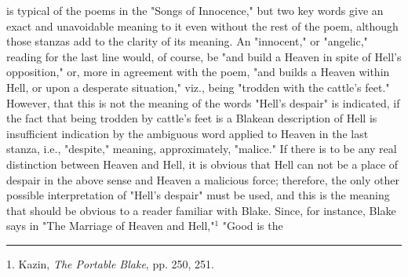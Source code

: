 is typical of the poems in the "Songs of Innocence," but two key words give an exact
and unavoidable meaning to it even without the rest of the poem, although those stanzas add to the clarity
of its meaning. An "innocent," or "angelic," reading for the last line would, of course, be "and build a Heaven in spite
of Hell's opposition," or, more in agreement with the poem, "and builds a Heaven within Hell, or upon a desperate situation,"
viz., being "trodden with the cattle's feet." However, that this is not the meaning of the words "Hell's despair" is
indicated, if the fact that being trodden by cattle's feet is a Blakean description of Hell is insufficient
indication by the ambiguous word applied to Heaven in the last stanza, i.e., "despite," meaning, approximately,
"malice." If there is to be any real distinction between Heaven and Hell, it is obvious that Hell can not be
a place of despair in the above sense and Heaven a malicious force; therefore, the only other possible interpretation
of "Hell's despair" must be used, and this is the meaning that should be obvious to a reader familiar with Blake. Since,
for instance, Blake says in "The Marriage of Heaven and Hell,"$^{1}$ "Good is the\linebreak
\null\par
\vspace*{-\baselineskip}
\vspace*{\fill}
\noindent\rule{0.25\textwidth}{0.4pt}\par
1. Kazin, \textit{The Portable Blake}, pp. 250, 251.\par

\newpage

